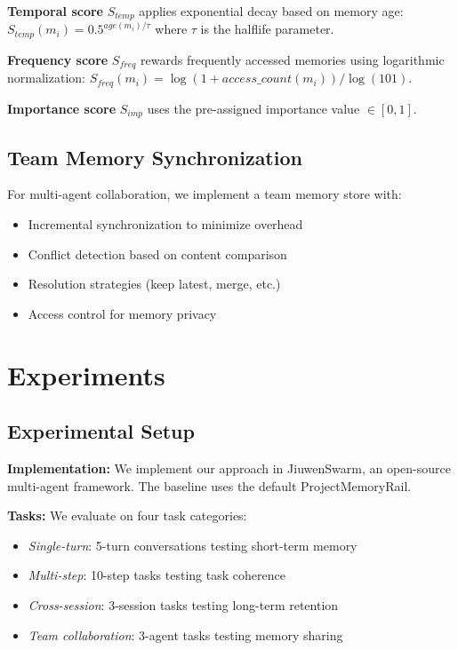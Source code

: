 \documentclass{article}
\begin{document}
\textbf{Temporal score} $S_{temp}$ applies exponential decay based on memory age:
$S_{temp}(m_i) = 0.5^{age(m_i) / \tau}$ where $\tau$ is the halflife parameter.

\textbf{Frequency score} $S_{freq}$ rewards frequently accessed memories using
logarithmic normalization: $S_{freq}(m_i) = \log(1 + access\_count(m_i)) / \log(101)$.

\textbf{Importance score} $S_{imp}$ uses the pre-assigned importance value $\in [0,1]$.

\subsection{Team Memory Synchronization}

For multi-agent collaboration, we implement a team memory store with:

\begin{itemize}
\item Incremental synchronization to minimize overhead
\item Conflict detection based on content comparison
\item Resolution strategies (keep latest, merge, etc.)
\item Access control for memory privacy
\end{itemize}

\section{Experiments}

\subsection{Experimental Setup}

\textbf{Implementation:} We implement our approach in JiuwenSwarm, an open-source
multi-agent framework. The baseline uses the default ProjectMemoryRail.

\textbf{Tasks:} We evaluate on four task categories:
\begin{itemize}
\item \textit{Single-turn}: 5-turn conversations testing short-term memory
\item \textit{Multi-step}: 10-step tasks testing task coherence
\item \textit{Cross-session}: 3-session tasks testing long-term retention
\item \textit{Team collaboration}: 3-agent tasks testing memory sharing
\end{itemize}
\end{document}
